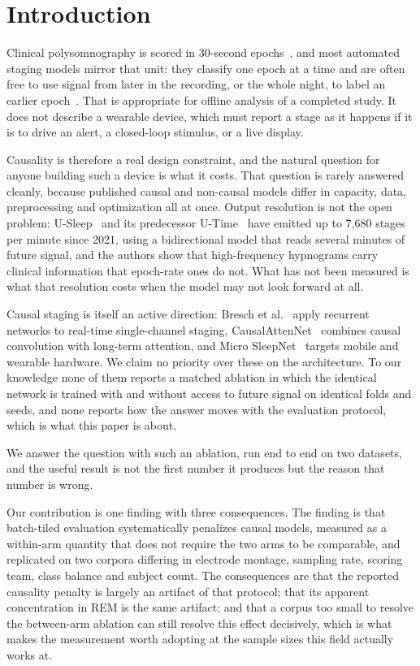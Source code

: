 \documentclass[conference]{IEEEtran}
\begin{document}
\section{Introduction}

Clinical polysomnography is scored in 30-second epochs~\cite{aasm}, and most automated staging
models mirror that unit: they classify one epoch at a time and are often free to use signal from
later in the recording, or the whole night, to label an earlier epoch~\cite{deepsleepnet,
attnsleep}. That is appropriate for offline analysis of a completed study. It does not describe a
wearable device, which must report a stage as it happens if it is to drive an alert, a
closed-loop stimulus, or a live display.

Causality is therefore a real design constraint, and the natural question for anyone building
such a device is what it costs. That question is rarely answered cleanly, because published
causal and non-causal models differ in capacity, data, preprocessing and optimization all at
once. Output resolution is not the open problem: U-Sleep~\cite{usleep} and its predecessor
U-Time~\cite{utime} have emitted up to 7{,}680 stages per minute since 2021, using a
bidirectional model that reads several minutes of future signal, and the authors show that
high-frequency hypnograms carry clinical information that epoch-rate ones do not. What has not
been measured is what that resolution costs when the model may not look forward at all.

Causal staging is itself an active direction: Bresch et al.~\cite{bresch} apply recurrent
networks to real-time single-channel staging, CausalAttenNet~\cite{causalattennet} combines
causal convolution with long-term attention, and Micro SleepNet~\cite{microsleepnet} targets
mobile and wearable hardware. We claim no priority over these on the architecture. To our
knowledge none of them reports a matched ablation in which the identical network is trained with
and without access to future signal on identical folds and seeds, and none reports how the answer
moves with the evaluation protocol, which is what this paper is about.

We answer the question with such an ablation, run end to end on two datasets, and the useful
result is not the first number it produces but the reason that number is wrong.

Our contribution is one finding with three consequences. The finding is that batch-tiled
evaluation systematically penalizes causal models, measured as a within-arm quantity that does
not require the two arms to be comparable, and replicated on two corpora differing in electrode
montage, sampling rate, scoring team, class balance and subject count. The consequences are that
the reported causality penalty is largely an artifact of that protocol; that its apparent
concentration in REM is the same artifact; and that a corpus too small to resolve the between-arm
ablation can still resolve this effect decisively, which is what makes the measurement worth
adopting at the sample sizes this field actually works at.
\end{document}
